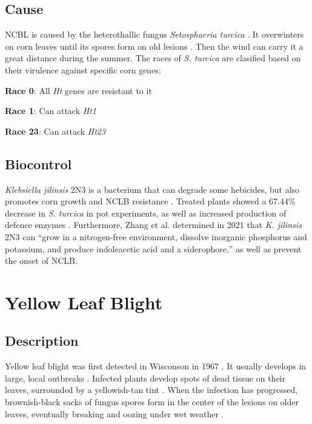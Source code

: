 \documentclass[letterpaper, 12pt]{report}
\begin{document}
\subsection{Cause}

NCBL is caused by the heterothallic fungus \emph{Setosphaeria turcica} \autocite{leonard1989proposed}. It overwinters on corn leaves until its spores form on old lesions \autocite{ullstrup1961corn}. Then the wind can carry it a great distance during the summer. The races of \emph{S. turcica} are clasified based on their virulence against specific corn genes:

\textbf{Race 0}: All \emph{Ht} genes are resistant to it

\textbf{Race 1}: Can attack \emph{Ht1}

\textbf{Race 23}: Can attack \emph{Ht23}

\subsection{Biocontrol}

\emph{Klebsiella jilinsis} 2N3 is a bacterium that can degrade some hebicides, but also promotes corn growth and NCLB resistance \autocite{zhang2021klebsiella}. Treated plants showed a 67.44\% decrease in \emph{S. turcica} in pot experiments, as well as increased production of defence enzymes \autocite{zhang2021klebsiella}. Furthermore, Zhang et al. determined in 2021 that \emph{K. jilinsis} 2N3 can ``grow in a nitrogen-free environment, dissolve inorganic phosphorus and potassium, and produce indoleacetic acid and a siderophore,'' as well as prevent the onset of NCLB.


\section{Yellow Leaf Blight}

\subsection{Description}

Yellow leaf blight was first detected in Wisconson in 1967 \autocite{comstock1973host}. It usually develops in large, local outbreaks \autocite{arny1971phyllosticta}. Infected plants develop spots of dead tissue on their leaves, surrounded by a yellowish-tan tint \autocite{ullstrup1961corn}. When the infection has progressed, brownish-black sacks of fungus spores form in the center of the lesions on older leaves, eventually breaking and oozing under wet weather \autocite{ullstrup1961corn}.
\end{document}
